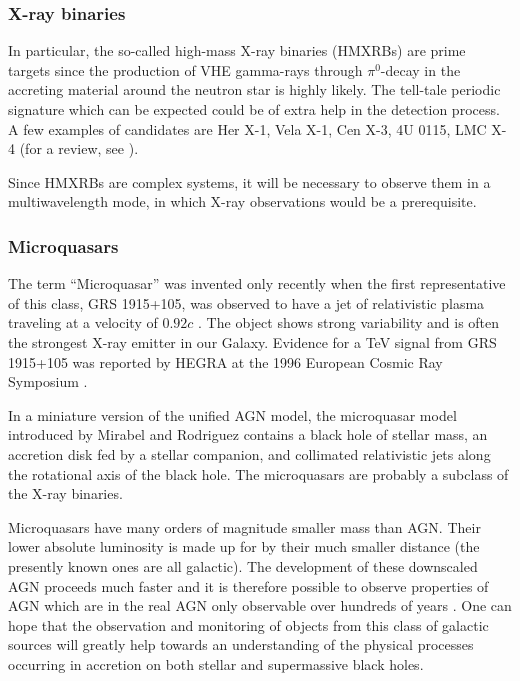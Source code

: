 \subsubsection{X-ray binaries}

\medskip In particular, the so-called high-mass X-ray binaries (HMXRBs) are prime
targets since the production of VHE gamma-rays through $\pi ^{0}$-decay in
the accreting material around the neutron star is highly likely. The
tell-tale periodic signature which can be expected could be of extra help in
the detection process. A few examples of candidates are Her X-1, Vela X-1,
Cen X-3, 4U 0115, LMC X-4 (for a review, see \cite{chadwick:92}).

Since HMXRBs are complex systems, it will be necessary to observe them in a
multiwavelength mode, in which X-ray observations would be a prerequisite.

\subsubsection{Microquasars}

\medskip The term ``Microquasar'' was invented only recently when the first
representative of this class, GRS 1915+105, was observed to have a jet of
relativistic plasma traveling at a velocity of $0.92 c$ \cite{mirabel:94}.
The object shows strong variability and is often the strongest X-ray emitter
in our Galaxy. Evidence for a TeV signal from GRS 1915+105 was reported by
HEGRA at the 1996 European Cosmic Ray Symposium \cite{aharonian:96}.

In a miniature version of the unified AGN model, the microquasar model
introduced by Mirabel and Rodriguez \cite{mirabel:94} contains a black hole
of stellar mass, an accretion disk fed by a stellar companion, and
collimated relativistic jets along the rotational axis of the black hole.
The microquasars are probably a subclass of the X-ray binaries.

Microquasars have many orders of magnitude smaller mass than AGN. Their
lower absolute luminosity is made up for by their much smaller distance (the
presently known ones are all galactic). The development of these downscaled
AGN proceeds much faster and it is therefore possible to observe properties
of AGN which are in the real AGN only observable over hundreds of years \cite{mirabel:94}. 
One can hope that the observation and monitoring of objects
from this class of galactic sources will greatly help towards an
understanding of the physical processes occurring in accretion on both
stellar and supermassive black holes.

